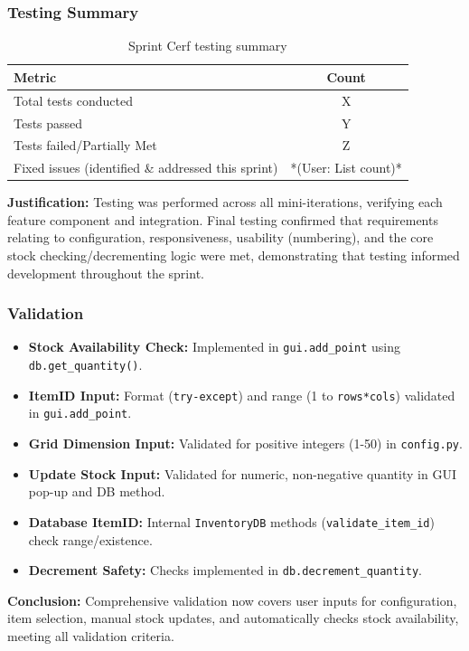 \newpage

\subsubsection{Testing Summary}

\begin{table}[!htbp]
	\centering
	\begin{tabular}{|l|c|}
		\hline
		\textbf{Metric} & \textbf{Count} \\
		\hline
		Total tests conducted & X \\ %
		\hline
		Tests passed & Y \\
		\hline
		Tests failed/Partially Met & Z \\
		\hline
		Fixed issues (identified \& addressed this sprint) & *(User: List count)* \\
		\hline
	\end{tabular}
	\caption{Sprint Cerf testing summary}
\end{table}
\textbf{Justification:} Testing was performed across all mini-iterations, verifying each feature component and integration. Final testing confirmed that requirements relating to configuration, responsiveness, usability (numbering), and the core stock checking/decrementing logic were met, demonstrating that testing informed development throughout the sprint.

\subsubsection{Validation}
	\begin{itemize}
		\item \textbf{Stock Availability Check:} Implemented in \verb|gui.add_point| using \verb|db.get_quantity()|.
		\item \textbf{ItemID Input:} Format (\verb|try-except|) and range (1 to \verb|rows*cols|) validated in \verb|gui.add_point|.
		\item \textbf{Grid Dimension Input:} Validated for positive integers (1-50) in \verb|config.py|.
		\item \textbf{Update Stock Input:} Validated for numeric, non-negative quantity in GUI pop-up and DB method.
		\item \textbf{Database ItemID:} Internal \verb|InventoryDB| methods (\verb|validate_item_id|) check range/existence.
		\item \textbf{Decrement Safety:} Checks implemented in \verb|db.decrement_quantity|.
	\end{itemize}
	\textbf{Conclusion:} Comprehensive validation now covers user inputs for configuration, item selection, manual stock updates, and automatically checks stock availability, meeting all validation criteria.
	
